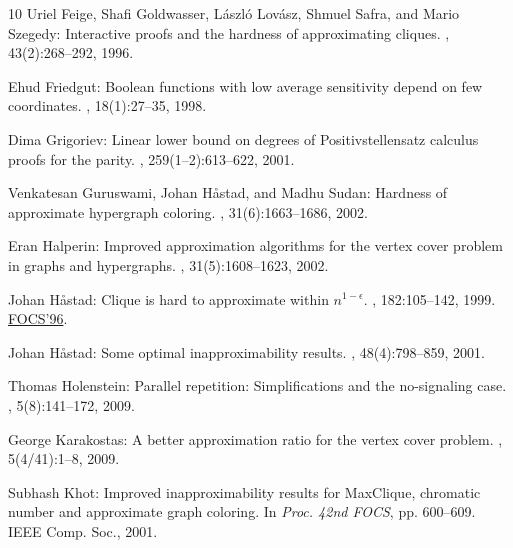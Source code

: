 \documentclass[11pt]{article}
\numberwithin{equation}{section}
\theoremstyle{definition}
\theoremstyle{plain}
\begin{document}
\begin{thebibliography}{10}
{\sc Uriel Feige, Shafi Goldwasser, L{\'a}szl{\'o} Lov\'{a}sz, Shmuel Safra,
  and Mario Szegedy}: Interactive proofs and the hardness of approximating
  cliques.
, 43(2):268--292, 1996.
\newblock [\epfmtdoi{10.1145/226643.226652}]

{\sc Ehud Friedgut}: Boolean functions with low average sensitivity depend on
  few coordinates.
, 18(1):27--35, 1998.
\newblock [\epfmtdoi{10.1007/PL00009809}]

{\sc Dima Grigoriev}: Linear lower bound on degrees of {P}ositivstellensatz
  calculus proofs for the parity.
, 259(1--2):613--622, 2001.
\newblock [\epfmtdoi{10.1016/S0304-3975(00)00157-2}]

{\sc Venkatesan Guruswami, Johan H{\aa}stad, and Madhu Sudan}: Hardness of
  approximate hypergraph coloring.
, 31(6):1663--1686, 2002.
\newblock [\epfmtdoi{10.1137/S0097539700377165}]

{\sc Eran Halperin}: Improved approximation algorithms for the vertex cover
  problem in graphs and hypergraphs.
, 31(5):1608--1623, 2002.
\newblock [\epfmtdoi{10.1137/S0097539700381097}]

{\sc Johan H{\aa}stad}: Clique is hard to approximate within $n^{1-\epsilon}$.
, 182:105--142, 1999.
\newblock \prelim \href{10.1109/SFCS.1996.548522}{FOCS'96}.
\newblock [\epfmtdoi{10.1007/BF02392825}]

{\sc Johan H{\aa}stad}: Some optimal inapproximability results.
, 48(4):798--859, 2001.
\newblock [\epfmtdoi{10.1145/502090.502098}]

{\sc Thomas Holenstein}: Parallel repetition: Simplifications and the
  no-signaling case.
, 5(8):141--172, 2009.

{\sc George Karakostas}: A better approximation ratio for the vertex cover
  problem.
, 5(4/41):1--8, 2009.
\newblock [\epfmtdoi{10.1145/1597036.1597045}]

{\sc Subhash Khot}: Improved inapproximability results for {MaxClique},
  chromatic number and approximate graph coloring.
\newblock In {\em Proc. 42nd FOCS}, pp. 600--609. IEEE Comp. Soc., 2001.


\end{thebibliography}
\end{document}
